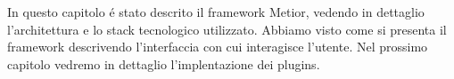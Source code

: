 In questo capitolo \'e stato descrito il framework Metior, vedendo in dettaglio l'architettura e lo stack tecnologico utilizzato.
Abbiamo visto come si presenta il framework descrivendo l'interfaccia con cui interagisce l'utente.
Nel prossimo capitolo vedremo in dettaglio l'implentazione dei plugins.
